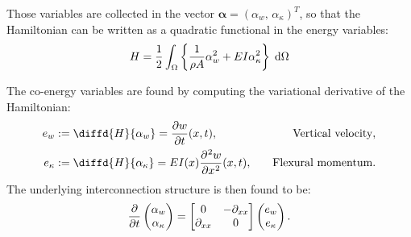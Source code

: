 Those variables are collected in the vector $\bm{\alpha} = (\alpha_{w}, \, \alpha_{\kappa})^T $, so that the Hamiltonian can be written as a quadratic functional in the energy variables: 
\begin{equation}
H = \energy{\frac{1}{\rho A} \alpha_{w}^2 + EI \alpha_\kappa^2}
\end{equation}

The co-energy variables are found by computing the variational derivative of the Hamiltonian:
\begin{equation}\label{eq:e_EB}
\begin{aligned}
e_{w} &:= \diffd{H}{\alpha_w} = \diffp{w}{t}(x,t) ,  &\quad \text{Vertical velocity}, \\
e_{\kappa} &:= \diffd{H}{\alpha_{\kappa}} =EI(x) \diffp[2]{w}{x}(x,t),  &\quad \text{Flexural momentum}. \\
\end{aligned}
\end{equation}
The underlying interconnection structure is then found to be:
\begin{equation}
\diffp{}{t}\begin{pmatrix}
\alpha_w \\ \alpha_\kappa \\
\end{pmatrix} = \begin{bmatrix}
0 & -\partial_{xx} \\
\partial_{xx} & 0 \\
\end{bmatrix} \begin{pmatrix}
e_w \\ e_\kappa \\
\end{pmatrix}.
\end{equation}

